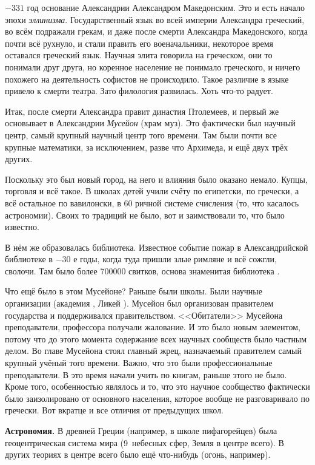 \documentclass[a4paper,oneside,fleqn,10pt]{article}
\begin{document}
$-331$ год основание Александрии Александром Македонским.
Это и есть начало эпохи \emph{эллинизма}. Государственный язык во всей империи Александра греческий,
во всём подражали грекам, и даже после смерти Александра Македонского,
когда почти всё рухнуло, и стали править его военачальники, некоторое время
оставался греческий язык.
Научная элита говорила на греческом, они то понимали друг друга, но коренное население
не понимало греческого, и ничего похожего на деятельность софистов
не происходило. Такое различие в языке привело к смерти театра.
Зато филология развилась. Хоть что-то радует.

Итак, после смерти Александра правит династия Птолемеев, и первый же 
основывает в Александрии \emph{Мусейон} (храм муз). Это фактически был научный центр,
самый крупный научный центр того времени. Там были почти все крупные математики,
за исключением, разве что Архимеда, и ещё двух трёх других.

Поскольку это был новый город, на него и влияния было оказано немало.
Купцы, торговля и всё такое. В школах детей учили счёту по египетски, по гречески,
а всё остальное по вавилонски, в 60 ричной системе счисления (то, что касалось
астрономии). Своих то традиций не было, вот и заимствовали то, что было известно.

В нём же образовалась библиотека. Известное событие пожар в Александрийской библиотеке
в $-30$ е годы, когда туда пришли злые римляне и всё сожгли, сволочи.
Там было более 700000 свитков, основа знаменитая библиотека .

Что ещё было в этом Мусейоне? Раньше были школы.
Были научные организации (академия , Ликей ).
Мусейон был организован правителем государства и поддерживался правительством.
<<Обитатели>> Мусейона преподаватели, профессора получали жалование.
И это было новым элементом, потому что до этого момента содержание
всех научных сообществ было частным делом.
Во главе Мусейона стоял главный жрец, назначаемый правителем самый крупный
учёный того времени.
Важно, что это были профессиональные преподаватели. В это время начали учить по книгам,
раньше этого не было. Кроме того, особенностью являлось и то, что это научное сообщество
фактически было заизолировано от основного населения, которое вообще не разговаривало
по гречески. Вот вкратце и все отличия от предыдущих школ.

\textbf{Астрономия.} В древней Греции (например, в школе пифагорейцев)
была геоцентрическая система мира (9~небесных сфер, Земля в центре всего).
В других теориях в центре всего было ещё что-нибудь (огонь, например).
\end{document}
